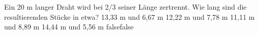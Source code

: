     {Ein 20 m langer Draht wird bei 2/3 seiner Länge zertrennt. Wie lang sind die resultierenden Stücke in etwa?}
    {13,33 m und 6,67 m}
    {12,22 m und 7,78 m}
    {11,11 m und 8,89 m}
    {14,44 m und 5,56 m}
    {false}{false}